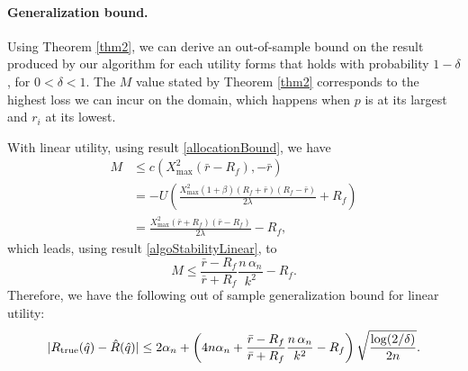 \paragraph{Generalization bound.}
Using Theorem \ref{thm2}, we can derive an out-of-sample bound on the result produced by
our algorithm for each utility forms that holds with probability $1-\delta$, for
$0<\delta<1$. The $M$ value stated by Theorem \ref{thm2} corresponds to the highest loss
we can incur on the domain, which happens when $p$ is at its largest and $r_i$ at its
lowest.

With linear utility, using result \eqref{allocationBound}, we have
\begin{align*}
  M &\leq c(X^2_{\max}(\bar r - R_f), -\bar r)\\
    &=-U\left(\frac{X^2_{\max}(1+\beta)(R_f+\bar r)(R_f-\bar r)}{2\lambda} + R_f\right)\\
    &=\frac{X^2_{\max}(\bar r + R_f)(\bar r - R_f)}{2\lambda} - R_f,
\end{align*}
which leads, using result \eqref{algoStabilityLinear}, to
\begin{equation*}
  M \leq \frac{\bar r - R_f}{\bar r + R_f}\frac{n\,\alpha_n}{k^2} - R_f.
\end{equation*}
Therefore, we have the following out of sample generalization bound for linear utility:
\begin{equation*}
  |R_{\mathrm{true}}(\hat{q}) - \hat{R}(\hat{q})| \leq 
     2\alpha_n + \left(4n\alpha_n + \frac{\bar r - R_f}{\bar r +
         R_f}\frac{n\,\alpha_n}{k^2} - R_f\right)
     \sqrt{\frac{\log(2/\delta)}{2n}}.
\end{equation*}


